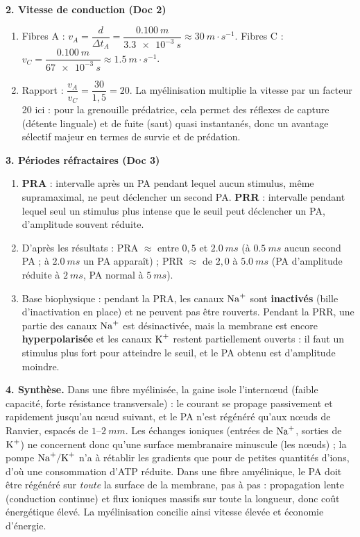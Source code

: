 \documentclass[11pt]{article}
\begin{document}
\begin{corrige}
\textbf{2. Vitesse de conduction (Doc 2)}
\begin{enumerate}
    \item[a)] Fibres A : $v_A = \dfrac{d}{\Delta t_A} = \dfrac{\SI{0,100}{m}}{\SI{3,3e-3}{s}} \approx \SI{30}{m\cdot s^{-1}}$. \quad Fibres C : $v_C = \dfrac{\SI{0,100}{m}}{\SI{67e-3}{s}} \approx \SI{1,5}{m\cdot s^{-1}}$.
    \item[b)] Rapport : $\dfrac{v_A}{v_C} = \dfrac{30}{1,5} = 20$. La myélinisation multiplie la vitesse par un facteur 20 ici : pour la grenouille prédatrice, cela permet des réflexes de capture (détente linguale) et de fuite (saut) quasi instantanés, donc un avantage sélectif majeur en termes de survie et de prédation.
\end{enumerate}
\textbf{3. Périodes réfractaires (Doc 3)}
\begin{enumerate}
    \item[a)] \textbf{PRA} : intervalle après un PA pendant lequel aucun stimulus, même supramaximal, ne peut déclencher un second PA. \textbf{PRR} : intervalle pendant lequel seul un stimulus plus intense que le seuil peut déclencher un PA, d'amplitude souvent réduite.
    \item[b)] D'après les résultats : PRA $\approx$ entre $0,5$ et $\SI{2,0}{ms}$ (à $\SI{0,5}{ms}$ aucun second PA ; à $\SI{2,0}{ms}$ un PA apparaît) ; PRR $\approx$ de $2,0$ à $\SI{5,0}{ms}$ (PA d'amplitude réduite à $\SI{2}{ms}$, PA normal à $\SI{5}{ms}$).
    \item[c)] Base biophysique : pendant la PRA, les canaux $\ce{Na+}$ sont \textbf{inactivés} (bille d'inactivation en place) et ne peuvent pas être rouverts. Pendant la PRR, une partie des canaux $\ce{Na+}$ est désinactivée, mais la membrane est encore \textbf{hyperpolarisée} et les canaux $\ce{K+}$ restent partiellement ouverts : il faut un stimulus plus fort pour atteindre le seuil, et le PA obtenu est d'amplitude moindre.
\end{enumerate}
\textbf{4. Synthèse.} Dans une fibre myélinisée, la gaine isole l'internœud (faible capacité, forte résistance transversale) : le courant se propage passivement et rapidement jusqu'au nœud suivant, et le PA n'est régénéré qu'aux nœuds de Ranvier, espacés de $1$--$\SI{2}{mm}$. Les échanges ioniques (entrées de $\ce{Na+}$, sorties de $\ce{K+}$) ne concernent donc qu'une surface membranaire minuscule (les nœuds) ; la pompe $\ce{Na+/K+}$ n'a à rétablir les gradients que pour de petites quantités d'ions, d'où une consommation d'ATP réduite. Dans une fibre amyélinique, le PA doit être régénéré sur \emph{toute} la surface de la membrane, pas à pas : propagation lente (conduction continue) et flux ioniques massifs sur toute la longueur, donc coût énergétique élevé. La myélinisation concilie ainsi vitesse élevée et économie d'énergie.


\end{corrige}
\end{document}

